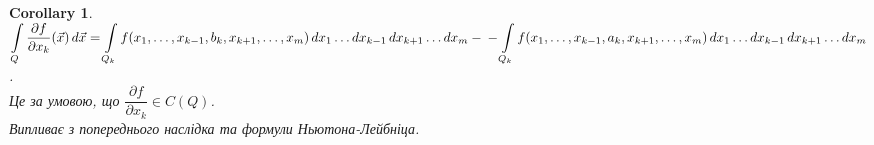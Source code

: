 \documentclass[a4paper, 10pt]{article}
\makeatletter
\def\departial#1#2{\dfrac{\partial {#1}}{\partial {#2}}}
\def\qed{$\blacksquare$}
\def\rightproof{$\boxed{\Rightarrow}$ }
\theoremstyle{theoremdd}
\theoremstyle{theoremdd}
\theoremstyle{theoremdd}
\theoremstyle{theoremdd}
\theoremstyle{theoremdd}
\theoremstyle{theoremdd}
\newtheorem{remark}[theorem]{Remark}
\theoremstyle{theoremdd}
\theoremstyle{theoremdd}
\newtheorem{corollary}[theorem]{Corollary}
\renewenvironment{proof}[1][Proof.\\]{\par
\pushQED{\hfill \qed}%
\normalfont \topsep6\p@\@plus6\p@\relax
\trivlist
\item\relax
{\bfseries
#1\@addpunct{.}}\hspace\labelsep\ignorespaces
}{%
\popQED\endtrivlist\@endpefalse
}
\makeatother
\begin{document}
\begin{corollary}
$\displaystyle\int\displaylimits_Q \departial{f}{x_k}(\vec{x})\,d\vec{x} = \displaystyle\int\displaylimits_{Q_k} f(x_1,\dots,x_{k-1},b_k,x_{k+1},\dots,x_m)\,dx_1\dots dx_{k-1}\,dx_{k+1}\dots dx_m - \\ - \int\displaylimits_{Q_k} f(x_1,\dots,x_{k-1},a_k,x_{k+1},\dots,x_m)\,dx_1\dots dx_{k-1}\,dx_{k+1}\dots dx_m$.\\
Це за умовою, що $\departial{f}{x_k} \in C(Q)$.\\
\textit{Випливає з попереднього наслідка та формули Ньютона-Лейбніца.}
\end{corollary}

\end{document}
